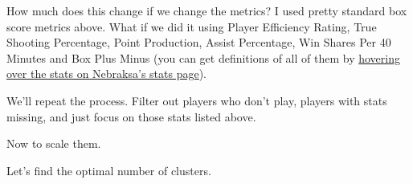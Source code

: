 \documentclass[]{book}
\newenvironment{Shaded}{\begin{snugshade}}{\end{snugshade}}
\newcommand{\DataTypeTok}[1]{\textcolor[rgb]{0.13,0.29,0.53}{#1}}
\newcommand{\DecValTok}[1]{\textcolor[rgb]{0.00,0.00,0.81}{#1}}
\newcommand{\KeywordTok}[1]{\textcolor[rgb]{0.13,0.29,0.53}{\textbf{#1}}}
\newcommand{\NormalTok}[1]{#1}
\newcommand{\OperatorTok}[1]{\textcolor[rgb]{0.81,0.36,0.00}{\textbf{#1}}}
\newcommand{\StringTok}[1]{\textcolor[rgb]{0.31,0.60,0.02}{#1}}
\begin{document}
How much does this change if we change the metrics? I used pretty standard box score metrics above. What if we did it using Player Efficiency Rating, True Shooting Percentage, Point Production, Assist Percentage, Win Shares Per 40 Minutes and Box Plus Minus (you can get definitions of all of them by \href{https://www.sports-reference.com/cbb/schools/nebraska/2020.html}{hovering over the stats on Nebraksa's stats page}).

We'll repeat the process. Filter out players who don't play, players with stats missing, and just focus on those stats listed above.

\begin{Shaded}
\end{Shaded}

Now to scale them.

\begin{Shaded}
\end{Shaded}

Let's find the optimal number of clusters.
\end{document}
